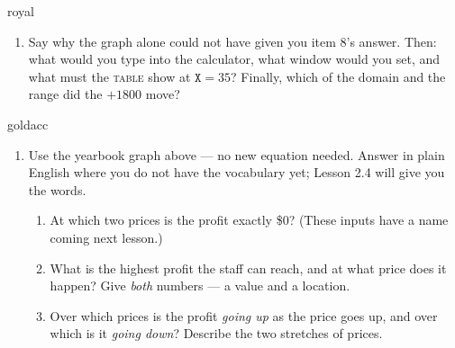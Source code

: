 \documentclass[10pt]{article}
\begin{document}
\begin{scenariobox}{royal}
\begin{enumerate}[leftmargin=1.6em, itemsep=6pt, topsep=2pt, start=6]
\item Say why the graph alone could not have given you item 8's answer. Then: what would you type
into the calculator, what window would you set, and what must the \textsc{table} show at
$\texttt{X}=35$? Finally, which of the domain and the range did the $+1800$ move?


\end{enumerate}
\end{scenariobox}

\vspace{0.10in}

\boxguard[24]
\begin{scenariobox}{goldacc}
\small
\begin{enumerate}[leftmargin=1.6em, itemsep=6pt, topsep=2pt, start=10]

\item Use the yearbook graph above --- no new equation needed. Answer in plain English where you do
not have the vocabulary yet; Lesson 2.4 will give you the words.
\begin{enumerate}[label=(\alph*), leftmargin=1.6em, itemsep=5pt, topsep=4pt]
  \item At which two prices is the profit exactly \$0? (These inputs have a name coming next
        lesson.)


  \item What is the highest profit the staff can reach, and at what price does it happen? Give
        \emph{both} numbers --- a value and a location.


  \item Over which prices is the profit \emph{going up} as the price goes up, and over which is it
        \emph{going down}? Describe the two stretches of prices.

\end{enumerate}

\end{enumerate}
\end{scenariobox}

\vspace{0.10in}
\end{document}

